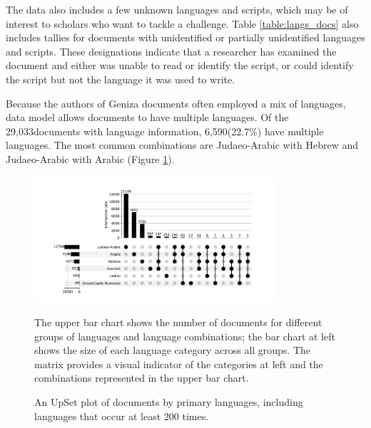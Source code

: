 \documentclass{article}
\def\documentsAnyLang{29,033}
\def\documentsMultiLang{6,590}
\def\percentDocsMultiLang{22.7\%}
\begin{document}
The data also includes a few unknown languages and scripts, which may be of interest to scholars who want to tackle a challenge. Table \ref{table:langs_docs} also includes tallies for documents with unidentified or partially unidentified languages and scripts. These designations indicate that a researcher has examined the document and either was unable to read or identify the script, or could identify the script but not the language it was used to write.

Because the authors of Geniza documents often employed a mix of languages,  data model allows documents to have multiple languages. Of the \documentsAnyLang documents with language information, \documentsMultiLang (\percentDocsMultiLang) have multiple languages. The most common combinations are Judaeo-Arabic with Hebrew and Judaeo-Arabic with Arabic (Figure \ref{fig:lang_combination_upset_plot}). 

\begin{figure}[!hbt]
  \centering
  \includegraphics[width=0.8\textwidth]{charts/primary_language_upsetplot.pdf}
  \caption{An UpSet plot of documents by primary languages, including languages that occur at least 200 times.}
    \medskip
    \small
    The upper bar chart shows the number of documents for different groups of languages and language combinations; the bar chart at left shows the size of each language category across all groups. The matrix provides a visual indicator of the categories at left and the combinations represented in the upper bar chart.\footnotemark
  \label{fig:lang_combination_upset_plot}
\end{figure}

\end{document}
